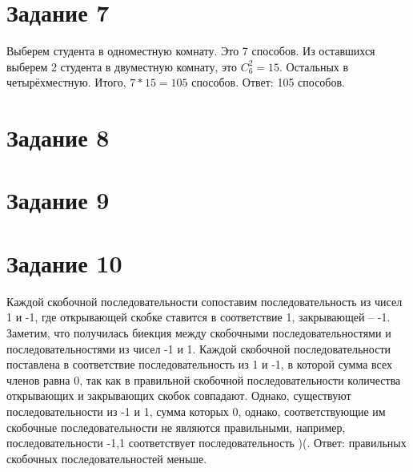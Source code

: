 \documentclass[a4paper, 12pt]{article}
\begin{document}
	\section*{Задание 7}
		Выберем студента в одноместную комнату. Это 7 способов. Из оставшихся выберем 2 студента в двуместную комнату, это $C_6^2=15$. Остальных в четырёхместную. Итого, $7*15=105$ способов.
		Ответ: 105 способов.
	\section*{Задание 8}
	\section*{Задание 9}

	\section*{Задание 10}
		Каждой скобочной последовательности сопоставим последовательность из чисел 1 и -1, где открывающей скобке ставится в соответствие 1, закрывающей -- -1. Заметим, что получилась биекция между скобочными последовательностями и последовательностями из чисел -1 и 1. Каждой скобочной последовательности поставлена в соответствие последовательность из 1 и -1, в которой сумма всех членов равна 0, так как в правильной скобочной последовательности количества открывающих и закрывающих скобок совпадают. Однако, существуют последовательности из -1 и 1, сумма которых 0, однако, соответствующие им скобочные последовательности не являются правильными, например, последовательности -1,1 соответствует последовательность )(.
		Ответ: правильных скобочных последовательностей меньше.
\end{document}
